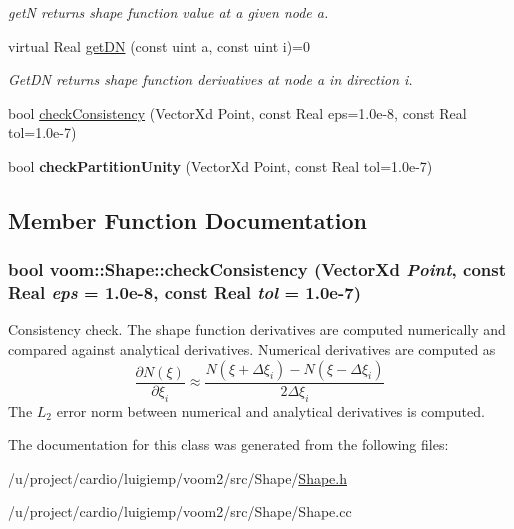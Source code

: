 \begin{DoxyCompactItemize}
\begin{DoxyCompactList}\small\item\em getN returns shape function value at a given node a. \item\end{DoxyCompactList}\item 
\hypertarget{classvoom_1_1_shape_a20d58544fca8f4c8a9360323204c2827}{
virtual Real \hyperlink{classvoom_1_1_shape_a20d58544fca8f4c8a9360323204c2827}{getDN} (const uint a, const uint i)=0}
\label{classvoom_1_1_shape_a20d58544fca8f4c8a9360323204c2827}

\begin{DoxyCompactList}\small\item\em GetDN returns shape function derivatives at node a in direction i. \item\end{DoxyCompactList}\item 
bool \hyperlink{classvoom_1_1_shape_a537587e56cf87b452bbd492261e8f504}{checkConsistency} (VectorXd Point, const Real eps=1.0e-\/8, const Real tol=1.0e-\/7)
\item 
\hypertarget{classvoom_1_1_shape_ab4fc3acfc7036908e4d87b58cf15960a}{
bool {\bfseries checkPartitionUnity} (VectorXd Point, const Real tol=1.0e-\/7)}
\label{classvoom_1_1_shape_ab4fc3acfc7036908e4d87b58cf15960a}

\end{DoxyCompactItemize}


\subsection{Member Function Documentation}
\hypertarget{classvoom_1_1_shape_a537587e56cf87b452bbd492261e8f504}{
\subsubsection[{checkConsistency}]{\setlength{\rightskip}{0pt plus 5cm}bool voom::Shape::checkConsistency (VectorXd {\em Point}, \/  const Real {\em eps} = {\ttfamily 1.0e-\/8}, \/  const Real {\em tol} = {\ttfamily 1.0e-\/7})}}
\label{classvoom_1_1_shape_a537587e56cf87b452bbd492261e8f504}
Consistency check. The shape function derivatives are computed numerically and compared against analytical derivatives. Numerical derivatives are computed as \[ \frac{\partial N(\xi)}{\partial \xi_i} \approx \frac{ N(\xi + \Delta \xi_i) - N(\xi - \Delta \xi_i) }{2\Delta \xi_i} \] The $L_2$ error norm between numerical and analytical derivatives is computed. 

The documentation for this class was generated from the following files:\begin{DoxyCompactItemize}
\item 
/u/project/cardio/luigiemp/voom2/src/Shape/\hyperlink{_shape_8h}{Shape.h}\item 
/u/project/cardio/luigiemp/voom2/src/Shape/Shape.cc\end{DoxyCompactItemize}
